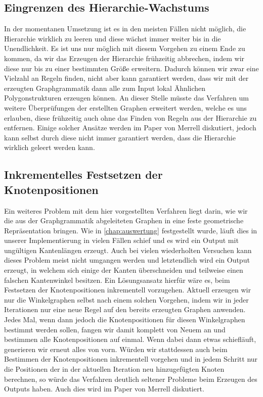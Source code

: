 \subsection{Eingrenzen des Hierarchie-Wachstums}
In der momentanen Umsetzung ist es in den meisten Fällen nicht möglich, die Hierarchie wirklich zu leeren und diese wächst immer weiter
bis in die Unendlichkeit. Es ist uns nur möglich mit diesem Vorgehen zu einem Ende zu kommen, da wir das Erzeugen der Hierarchie
frühzeitig abbrechen, indem wir diese nur bis zu einer bestimmten Größe erweitern. Dadurch können wir zwar eine Vielzahl an Regeln finden,
nicht aber kann garantiert werden, dass wir mit der erzeugten Graphgrammatik dann alle zum Input lokal Ähnlichen Polygonstrukturen
erzeugen können. An dieser Stelle müsste das Verfahren um weitere Überprüfungen der erstellten Graphen erweitert werden, welche es uns
erlauben, diese frühzeitig auch ohne das Finden von Regeln aus der Hierarchie zu entfernen. Einige solcher Ansätze werden im Paper von
Merrell \cite{1_merrell} diskutiert, jedoch kann selbst durch diese nicht immer garantiert werden, dass die Hierarchie wirklich geleert
werden kann. \cite{1_merrell}

\subsection{Inkrementelles Festsetzen der Knotenpositionen}
Ein weiteres Problem mit dem hier vorgestellten Verfahren liegt darin, wie wir die aus der Graphgrammatik abgeleiteten Graphen in
eine feste geometrische Repräsentation bringen. Wie in \autoref{chap:auswertung} festgestellt wurde, läuft dies in unserer Implementierung
in vielen Fällen schief und es wird ein Output mit ungültigen Kantenlängen erzeugt. Auch bei vielen wiederholten Versuchen kann dieses
Problem meist nicht umgangen werden und letztendlich wird ein Output erzeugt, in welchem sich einige der Kanten überschneiden und teilweise
einen falschen Kantenwinkel besitzen. Ein Lösungsansatz hierfür wäre es, beim Festsetzen der Knotenpositionen inkrementell vorzugehen.
Aktuell erzeugen wir nur die Winkelgraphen selbst nach einem solchen Vorgehen, indem wir in jeder Iterationen nur eine neue Regel auf
den bereits erzeugten Graphen anwenden. Jedes Mal, wenn dann jedoch die Knotenpositionen für diesen Winkelgraphen bestimmt werden sollen,
fangen wir damit komplett von Neuem an und bestimmen alle Knotenpositionen auf einmal. Wenn dabei dann etwas schiefläuft, generieren wir
erneut alles von vorn. Würden wir stattdessen auch beim Bestimmen der Knotenpositionen inkrementell vorgehen und in jedem Schritt nur die
Positionen der in der aktuellen Iteration neu hinzugefügten Knoten berechnen, so würde das Verfahren deutlich seltener Probleme beim
Erzeugen des Outputs haben. Auch dies wird im Paper von Merrell diskutiert. \cite{1_merrell}

